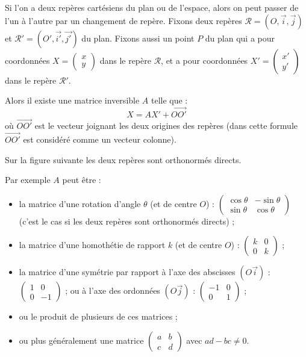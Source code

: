 \documentclass[class=report,crop=false]{standalone}
\newcommand{\vect}{\overrightarrow}
\begin{document}
Si l'on a deux repères cartésiens du plan ou de l'espace, alors on peut passer
de l'un à l'autre par un changement de repère. 
Fixons deux repères $\mathcal{R}= (O,\vect{i},\vect{j})$ et 
$\mathcal{R}'= (O',\vect{i'},\vect{j'})$ du plan. Fixons aussi un point $P$ du plan
qui a pour coordonnées $X = \left(\begin{smallmatrix}x\\y\end{smallmatrix}\right)$
dans le repère $\mathcal{R}$, et a pour coordonnées
$X' = \left(\begin{smallmatrix}x'\\y'\end{smallmatrix}\right)$
dans le repère $\mathcal{R}'$.

Alors il existe une matrice inversible $A$ telle que :
$$X = A X' + \vect{OO'}$$
où $\vect{OO'}$ est le vecteur joignant les deux origines des repères
(dans cette formule $\vect{OO'}$ est considéré comme un vecteur colonne).

Sur la figure suivante les deux repères sont orthonormés directs.

Par exemple $A$ peut être :
\begin{itemize}
  \item la matrice d'une rotation d'angle $\theta$ (et de centre $O$) :
$\begin{pmatrix}\cos\theta&-\sin\theta\\\sin\theta&\cos\theta\end{pmatrix}$ 
(c'est le cas si les deux repères sont orthonormés directs) ;
  \item la matrice d'une homothétie de rapport $k$ (et de centre $O$) :
$\begin{pmatrix}k&0\\0&k\end{pmatrix}$ ;
  \item la matrice d'une symétrie par rapport à l'axe des
  abscisses $(O\vect{i})$ : $\begin{pmatrix}1&0\\0&-1\end{pmatrix}$ ;
  ou à l'axe des ordonnées $(O\vect{j})$ : $\begin{pmatrix}-1&0\\0&1\end{pmatrix}$ ;
  \item ou le produit de plusieurs de ces matrices ;
  \item ou plus généralement une matrice $\begin{pmatrix}a&b\\c&d\end{pmatrix}$
  avec $ad-bc\neq 0$.
\end{itemize}
\end{document}
